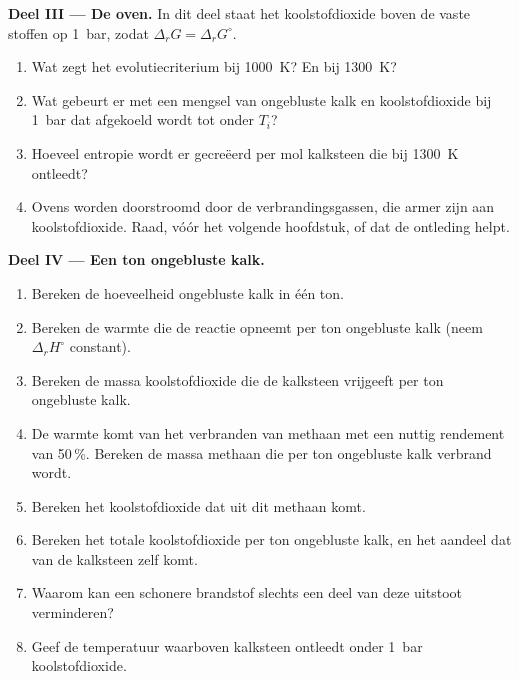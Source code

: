 \begin{problem}
\medskip
\noindent\textbf{Deel III --- De oven.}
In dit deel staat het koolstofdioxide boven de vaste stoffen op \qty{1}{bar}, zodat
$\Delta_r G = \Delta_r G^\circ$.
\begin{enumerate}[resume]
  \item Wat zegt het evolutiecriterium bij \qty{1000}{K}? En bij
        \qty{1300}{K}?
  \item Wat gebeurt er met een mengsel van ongebluste kalk en koolstofdioxide bij
        \qty{1}{bar} dat afgekoeld wordt tot onder $T_i$?
  \item Hoeveel entropie wordt er gecreëerd per mol kalksteen die bij
        \qty{1300}{K} ontleedt?
  \item Ovens worden doorstroomd door de verbrandingsgassen, die armer zijn aan koolstofdioxide.
        Raad, vóór het volgende hoofdstuk, of dat de
        ontleding helpt.
\end{enumerate}

\medskip
\noindent\textbf{Deel IV --- Een ton ongebluste kalk.}
\begin{enumerate}[resume]
  \item Bereken de hoeveelheid ongebluste kalk in één ton.
  \item Bereken de warmte die de reactie opneemt per ton ongebluste kalk
        (neem $\Delta_r H^\circ$ constant).
  \item Bereken de massa koolstofdioxide die de kalksteen vrijgeeft per
        ton ongebluste kalk.
  \item De warmte komt van het verbranden van methaan met een nuttig rendement van
        50\,\%. Bereken de massa methaan die per ton ongebluste kalk verbrand wordt.
  \item Bereken het koolstofdioxide dat uit dit methaan komt.
  \item Bereken het totale koolstofdioxide per ton ongebluste kalk, en het aandeel
        dat van de kalksteen zelf komt.
  \item Waarom kan een schonere brandstof slechts een deel van deze uitstoot verminderen?
  \item Geef de temperatuur waarboven kalksteen ontleedt onder
        \qty{1}{bar} koolstofdioxide.
\end{enumerate}
\end{problem}
